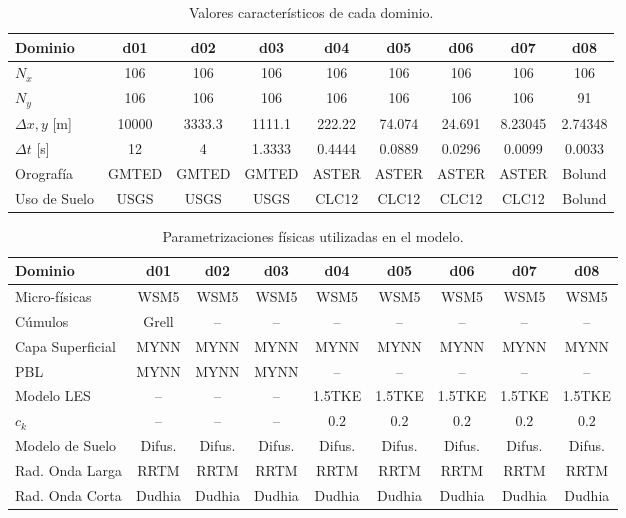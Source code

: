 \begin{table}[H]
	\caption{Valores característicos de cada dominio.}\label{tab:05_caract_bol}
	\centering\footnotesize
	\begin{tabular}{lcccccccc}
		\toprule
		Dominio 				& d01	&	d02	&	d03	&	d04	&	d05	&	d06 &	d07&	d08 \\
		\midrule
		$N_x$		& 106 & 106 & 106 &106&106&106&106&106  \\
		$N_y$	 		& 106 & 106 & 106 &106&106&106&106&91  \\
		$\Delta x, y$	[m]	 		& 10000 & 3333.3 & 1111.1 &222.22&74.074&24.691&8.23045&2.74348  \\
		$\Delta t$	[s]	 		& 12 & 4 & 1.3333 &0.4444&0.0889&0.0296&0.0099&0.0033  \\
		Orografía		 	& GMTED & GMTED & GMTED &ASTER&ASTER&ASTER&ASTER&Bolund  \\
		Uso de Suelo		& USGS & USGS & USGS &CLC12&CLC12&CLC12&CLC12&Bolund \\
		\bottomrule
	\end{tabular}
\end{table}

\begin{table}[H]
	\caption{Parametrizaciones físicas utilizadas en el modelo.}\label{tab:05_param_bol}
	\centering\footnotesize
	\begin{tabular}{lcccccccc}
		\toprule
		Dominio 				& d01	&	d02	&	d03	&	d04	&	d05	&	d06 &	d07& d08\\
		\midrule
		Micro-físicas		 	& WSM5 & WSM5 & WSM5 &WSM5&WSM5&WSM5&WSM5& WSM5 \\
		Cúmulos			 		& Grell & -- & -- & -- & -- & -- & -- & -- \\ 
		Capa Superficial	 	& MYNN & MYNN & MYNN & MYNN & MYNN & MYNN & MYNN& MYNN\\
		PBL				 		& MYNN & MYNN & MYNN & -- & -- & -- & -- &--\\
		Modelo LES				 		& -- & -- & -- & 1.5TKE & 1.5TKE & 1.5TKE & 1.5TKE& 1.5TKE \\
		$c_k$				 		& -- & -- & -- & $0.2$ & $0.2$ & $0.2$ & $0.2$& $0.2$ \\
		Modelo de Suelo 		& Difus. & Difus. & Difus. & Difus. & Difus. & Difus. & Difus.& Difus. \\
		Rad. Onda Larga	& RRTM &RRTM&RRTM&RRTM&RRTM&RRTM&RRTM& RRTM\\
		Rad. Onda Corta	& Dudhia &Dudhia&Dudhia&Dudhia&Dudhia&Dudhia&Dudhia& Dudhia\\
		\bottomrule
	\end{tabular}
\end{table}

